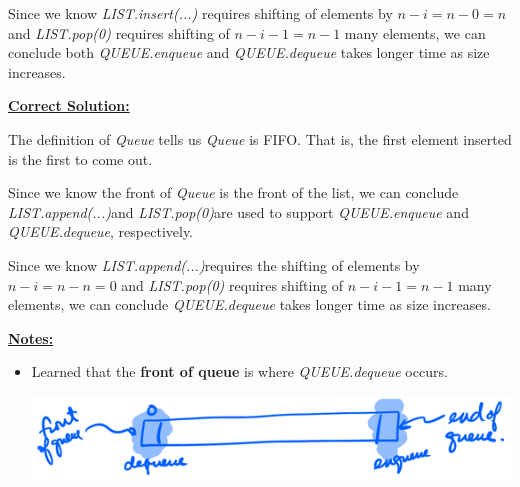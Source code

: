 \documentclass[12pt]{article}
\begin{document}
\begin{enumerate}[a.]
    \bigskip

    Since we know \textit{LIST.insert(...)} requires shifting of elements by $n - i = n - 0 = n$
    and \textit{LIST.pop(0)} requires shifting of $n - i - 1 = n - 1$ many elements,
    we can conclude both \textit{QUEUE.enqueue} and \textit{QUEUE.dequeue} takes
    longer time as size increases.

    \bigskip

    \begin{mdframed}
        \underline{\textbf{Correct Solution:}}

        The definition of \textit{Queue} tells us \textit{Queue} is FIFO. That is,
        the first element inserted is the first to come out.

        \bigskip

        Since we know the front of \textit{Queue} is the front of the list, we
        can conclude \color{red}\textit{LIST.append(...)}\color{black}\:and \color{red}\textit{LIST.pop(0)}\color{black}\:are used
        to support \textit{QUEUE.enqueue} and \textit{QUEUE.dequeue}, respectively.

        \bigskip

        Since we know \color{red}\textit{LIST.append(...)}\color{black}\:requires the shifting of elements by $n - i = n - n = 0$
        and \textit{LIST.pop(0)} requires shifting of $n - i - 1 = n - 1$ many elements,
        we can conclude \textit{QUEUE.dequeue} takes longer time as size increases.

    \end{mdframed}

    \bigskip

    \underline{\textbf{Notes:}}

    \bigskip

    \begin{itemize}
        \item Learned that the \textbf{front of queue} is where \textit{QUEUE.dequeue}
        occurs.

        \begin{center}
        \includegraphics[width=0.8 \linewidth]{images/worksheet_11_q1e_notes.png}
        \end{center}
    \end{itemize}

\end{enumerate}
\end{document}
